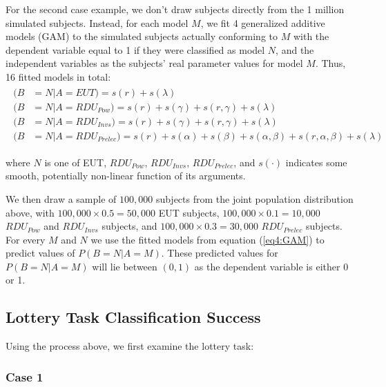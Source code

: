 \documentclass[11pt,a4paper]{report}
\begin{document}
For the second case example, we don't draw subjects directly from the 1 million simulated subjects.
Instead, for each model $M$, we fit 4 generalized additive models (GAM) \parencite{Hastie1986} to the simulated subjects actually conforming to $M$ with the dependent variable equal to 1 if they were classified as model $N$, and the independent variables as the subjects' real parameter values for model $M$.
Thus, 16 fitted models in total:
\begin{align}
	\label{eq4:GAM}
	\begin{split}
		(B &= N | A = EUT)                   = s(r) + s(\lambda)\\
		(B &= N | A = \mathit{RDU_{Pow}})    = s(r) + s(\gamma) + s(r, \gamma) + s(\lambda)\\
		(B &= N | A = \mathit{RDU_{Invs}})   = s(r) + s(\gamma) + s(r, \gamma) + s(\lambda)\\
		(B &= N | A = \mathit{RDU_{Prelec}}) = s(r) + s(\alpha) + s(\beta) +s(\alpha, \beta) + s(r, \alpha, \beta) + s(\lambda)
	\end{split}
\end{align}

\noindent where $N$ is one of EUT, $\mathit{RDU_{Pow}}$, $\mathit{RDU_{Invs}}$, $\mathit{RDU_{Prelec}}$, and $s(\cdot)$ indicates some smooth, potentially non-linear function of its arguments.

We then draw a sample of $100,000$ subjects from the joint population distribution above, with $100,000 \times 0.5 = 50,000$ EUT subjects, $100,000 \times 0.1 = 10,000$ $\mathit{RDU_{Pow}}$ and $\mathit{RDU_{Invs}}$ subjects, and $100,000 \times 0.3 = 30,000$ $\mathit{RDU_{Prelec}}$ subjects.
For every $M$ and $N$ we use the fitted models from equation (\ref{eq4:GAM}) to predict values of $P(B = N | A = M)$.
These predicted values for $P(B = N | A = M)$ will lie between $(0, 1)$ as the dependent variable is either 0 or 1.

\subsection{ \texorpdfstring{\textcite{Harrison2016}}{Harrison and Ng (2016)} Lottery Task Classification Success}

Using the process above, we first examine the \textcite{Harrison2016} lottery task:

\subsubsection{Case 1}
\end{document}
